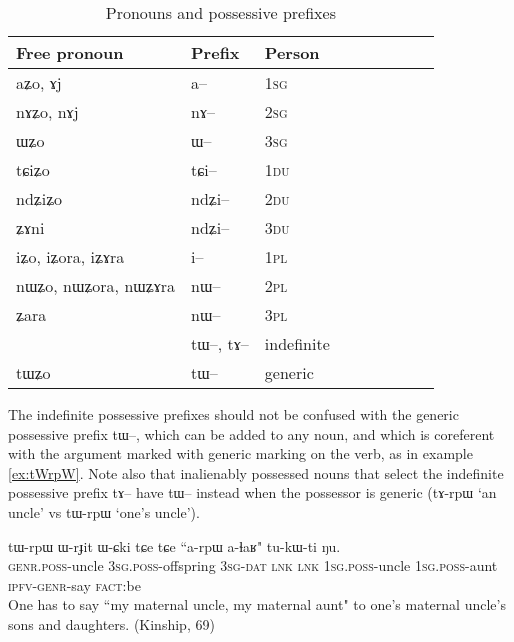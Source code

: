\documentclass[oldfontcommands,oneside,a4paper,11pt]{article}
\newcommand{\ipa}[1]{{\phon #1}} %
\begin{document}
\begin{table}[H] \centering
\caption{Pronouns and possessive prefixes }\label{tab:pronoun}
\begin{tabular}{lllllllll} 
\toprule
 Free pronoun & Prefix & Person\\
\midrule
 \ipa{aʑo},    \ipa{ɤj} &	\ipa{a--}  &		1\textsc{sg} \\
\ipa{nɤʑo},  \ipa{nɤj} &	\ipa{nɤ--}  &			2\textsc{sg}\\
\ipa{ɯʑo}  &	\ipa{ɯ--}  &			3\textsc{sg}\\
\midrule
\ipa{tɕiʑo}  &	\ipa{tɕi--}  &			1\textsc{du} \\
\ipa{ndʑiʑo}  &	\ipa{ndʑi--}  &		2\textsc{du} \\	
\ipa{ʑɤni}  &	\ipa{ndʑi--}  &		3\textsc{du} \\	
\midrule
\ipa{iʑo}, \ipa{iʑora},   \ipa{iʑɤra}   &	\ipa{i--}  &			1\textsc{pl} \\
\ipa{nɯʑo}, \ipa{nɯʑora},   \ipa{nɯʑɤra}  &	\ipa{nɯ--}  &			2\textsc{pl} \\
\ipa{ʑara}  &	\ipa{nɯ--}  &			3\textsc{pl} \\
\midrule
&  \ipa{tɯ--},  \ipa{tɤ--} & indefinite \\
\ipa{tɯʑo} & \ipa{tɯ--}   &  generic\\
\bottomrule
\end{tabular}
\end{table}

The indefinite possessive prefixes should not be confused with the generic possessive prefix \ipa{tɯ--}, which can be added to any noun, and which is coreferent with the argument marked with generic marking on the verb, as in example \ref{ex:tWrpW}. Note also that inalienably possessed nouns that select the indefinite possessive prefix \ipa{tɤ--} have \ipa{tɯ--} instead when the possessor is generic (\ipa{tɤ-rpɯ} `an uncle' vs \ipa{tɯ-rpɯ} `one's uncle').

\begin{exe}
\ex \label{ex:tWrpW}
\gll
 \ipa{tɯ-rpɯ} 	\ipa{ɯ-rɟit} 	\ipa{ɯ-ɕki} 	\ipa{tɕe} 	\ipa{tɕe} 	``\ipa{a-rpɯ} \ipa{a-ɬaʁ}" 	\ipa{tu-kɯ-ti} 	\ipa{ŋu.} \\
\textsc{genr.poss}-uncle \textsc{3sg.poss}-offspring \textsc{3sg-dat} \textsc{lnk} \textsc{lnk} \textsc{1sg.poss}-uncle \textsc{1sg.poss}-aunt \textsc{ipfv-genr}-say \textsc{fact}:be \\
\glt One has to say ``my maternal uncle, my maternal aunt" to one's maternal uncle's sons and daughters. (Kinship, 69)
\end{exe}
\end{document}
